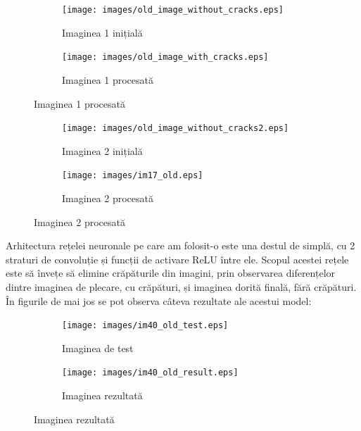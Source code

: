 \documentclass[12pt]{article}
\begin{document}
\begin{figure}[h!]
    \begin{subfigure}{0.49\textwidth}
        \centering
        \texttt{[image: images/old\_image\_without\_cracks.eps]}
        \caption{Imaginea 1 inițială}
        \label{fig:old_image_without_cracks}
    \end{subfigure}
    \hspace{10pt}
    \begin{subfigure}{0.49\textwidth}
        \centering
        \texttt{[image: images/old\_image\_with\_cracks.eps]}
        \caption{Imaginea 1 procesată}
        \label{fig:old_image_with_cracks}
    \end{subfigure}
\end{figure}

\begin{figure}[h!]
    \begin{subfigure}{0.49\textwidth}
        \centering
        \texttt{[image: images/old\_image\_without\_cracks2.eps]}
        \caption{Imaginea 2 inițială}
        \label{fig:old_image_without_cracks2}
    \end{subfigure}
    \hspace{10pt}
    \begin{subfigure}{0.49\textwidth}
        \centering
        \texttt{[image: images/im17\_old.eps]}
        \caption{Imaginea 2 procesată}
        \label{fig:im17_old}
    \end{subfigure}
\end{figure}

\indent Arhitectura rețelei neuronale pe care am folosit-o este una destul de simplă, cu 2 straturi de convoluție și funcții de activare ReLU între ele. Scopul acestei rețele este să învețe să elimine crăpăturile din imagini, prin observarea diferențelor dintre imaginea de plecare, cu crăpături, și imaginea dorită finală, fără crăpături. În figurile de mai jos se pot observa câteva rezultate ale acestui model:

\begin{figure}[h!]
    \begin{subfigure}{0.49\textwidth}
        \centering
        \texttt{[image: images/im40\_old\_test.eps]}
        \caption{Imaginea de test}
        \label{fig:im40_old_test}
    \end{subfigure}
    \hspace{10pt}
    \begin{subfigure}{0.49\textwidth}
        \centering
        \texttt{[image: images/im40\_old\_result.eps]}
        \caption{Imaginea rezultată}
        \label{fig:im17_old}
    \end{subfigure}
\end{figure}
\end{document}
